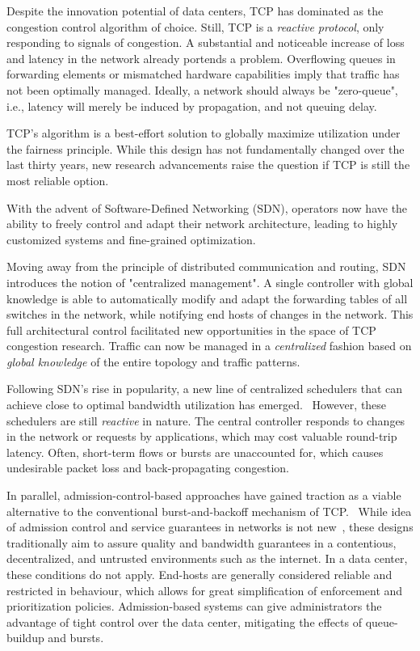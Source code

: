 Despite the innovation potential of data centers, TCP has dominated as 
the congestion control algorithm of choice.
Still, TCP is a \textit{reactive protocol}, only responding to signals of 
congestion. A substantial and noticeable increase of loss and latency in the 
network already portends a problem. Overflowing queues in forwarding elements 
or mismatched hardware capabilities imply that traffic has not been optimally 
managed.
Ideally, a network should always be "zero-queue", i.e., latency 
will merely be induced by propagation, and not queuing delay.

TCP's algorithm is a best-effort solution to globally maximize utilization 
under the fairness principle. While this design has not fundamentally changed 
over the last thirty years, new research advancements raise the question if TCP 
is still the most reliable option.~\cite{pcc,bbr,perc}

With the advent of Software-Defined Networking (SDN), operators now have the 
ability to freely control and adapt their network architecture, leading to 
highly customized systems and fine-grained optimization.~\cite{sdn_road}

Moving away from the principle of distributed communication and routing, SDN 
introduces the notion of "centralized management". A single controller with 
global knowledge is able to automatically modify and adapt the forwarding 
tables of all switches in the network, while notifying end hosts of changes in 
the network.
This full architectural control facilitated new opportunities in the space of 
TCP congestion research. Traffic can now be managed in a  \textit{centralized} 
fashion based on \textit{global knowledge} of the entire topology and traffic 
patterns.

Following SDN's rise in popularity, a new line of centralized schedulers that 
can achieve close to optimal bandwidth utilization has emerged.~\cite{hedera, 
fastpass, microte, b4, dionysus}
However, these schedulers are still \textit{reactive} in nature. The central 
controller responds to changes in the network or requests by applications, 
which may cost valuable round-trip latency. Often, short-term flows or bursts 
are unaccounted for, which causes undesirable packet loss and back-propagating 
congestion.~\cite{perc}

In parallel, admission-control-based approaches have gained traction as a 
viable alternative to the conventional burst-and-backoff mechanism of 
TCP.~\cite{expresspass, fastpass, perc}
While idea of admission control and service guarantees in networks is not 
new~\cite{access_limit, access_limit2}, these designs traditionally 
aim to assure quality and bandwidth guarantees in a contentious, decentralized, 
and untrusted environments such as the internet. In a data center, these 
conditions do not apply. End-hosts are generally considered reliable and 
restricted in behaviour, which allows for great simplification of enforcement 
and prioritization policies. Admission-based systems can give administrators 
the advantage of tight control over the data center, mitigating the effects of 
queue-buildup and bursts.

